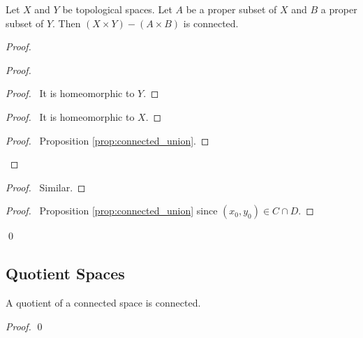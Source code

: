 \begin{prop}
Let $X$ and $Y$ be topological spaces. Let $A$ be a proper subset of $X$ and $B$ a proper subset of $Y$. Then $(X \times Y) - (A \times B)$ is connected.
\end{prop}

\begin{proof}
\pf
{}
\begin{proof}
	\begin{proof}
		\pf\ It is homeomorphic to $Y$.
	\end{proof}
	\begin{proof}
		\pf\ It is homeomorphic to $X$.
	\end{proof}
	\begin{proof}
		\pf\ Proposition \ref{prop:connected_union}.
	\end{proof}
\end{proof}
\begin{proof}
	\pf\ Similar.
\end{proof}
\begin{proof}
	\pf\ Proposition \ref{prop:connected_union} since $(x_0,y_0) \in C \cap D$.
\end{proof}
\qed
\end{proof}

\subsection{Quotient Spaces}

\begin{prop}
A quotient of a connected space is connected.
\end{prop}

\begin{proof}
\pf
{}
\qed
\end{proof}

